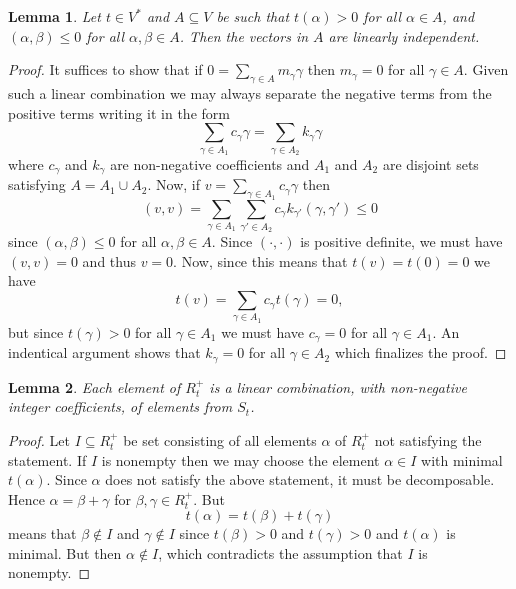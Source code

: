 \documentclass[twoside,utf8]{article}
\theoremstyle{plain}
\newtheorem{lemma}{Lemma}
\theoremstyle{definition}
\theoremstyle{remark}
\begin{document}
\begin{lemma} \label{lem:linIndep}
Let $t\in V^*$ and $A \subseteq V$ be such that $t(\alpha)>0$ for all $\alpha \in A$, and $(\alpha,\beta)\leq 0$ for all $\alpha,\beta \in A$. Then the vectors in $A$ are linearly independent.
\end{lemma}
\begin{proof}
It suffices to show that if $0=\sum_{\gamma\in A}m_\gamma \gamma$ then $m_\gamma=0$ for all $\gamma \in A$. Given such a linear combination we may always separate the negative terms from the positive terms writing it in the form
\[
\sum_{\gamma \in A_1} c_\gamma \gamma = \sum_{\gamma \in A_2}k_\gamma \gamma
\]
where $c_\gamma$ and $k_\gamma$ are non-negative coefficients and $A_1$ and $A_2$ are disjoint sets satisfying $A=A_1\cup A_2$. Now, if $v = \sum_{\gamma \in A_1}c_\gamma \gamma$ then 
\[
(v,v) =  \sum_{\gamma \in A_1} \sum_{\gamma' \in A_2} c_\gamma k_{\gamma'} (\gamma,\gamma') \leq 0
\]
since $(\alpha,\beta)\leq 0$ for all $\alpha,\beta \in A$. Since $(\cdot,\cdot)$ is positive definite, we must have $(v,v)=0$ and thus $v=0$. Now, since this means that $t(v)=t(0)=0$ we have
\[
t(v)=\sum_{\gamma \in A_1} c_\gamma t(\gamma)=0,
\]
but since $t(\gamma)>0$ for all $\gamma \in A_1$ we must have $c_\gamma=0$ for all $\gamma \in A_1$. An indentical argument shows that $k_\gamma=0$ for all $\gamma \in A_2$ which finalizes the proof.
\end{proof}

\begin{lemma} \label{lem:nonNegativeIntegers}
Each element of $R^+_t$ is a linear combination, with non-negative integer coefficients, of elements from $S_t$.
\end{lemma}
\begin{proof}
Let $I\subseteq R^+_t$ be set consisting of all elements $\alpha$ of $R^+_t$ not satisfying the statement. If $I$ is nonempty then we may choose the element $\alpha \in I$ with minimal $t(\alpha)$. Since $\alpha$ does not satisfy the above statement, it must be decomposable. Hence $\alpha=\beta+\gamma$ for $\beta,\gamma \in R^+_t$. But
\[
t(\alpha) = t(\beta)+t(\gamma)
\]
means that $\beta \notin I$ and $\gamma \notin I$ since $t(\beta)>0$ and $t(\gamma)>0$ and $t(\alpha)$ is minimal. But then $\alpha \notin I$, which contradicts the assumption that $I$ is nonempty.
\end{proof}
\end{document}

